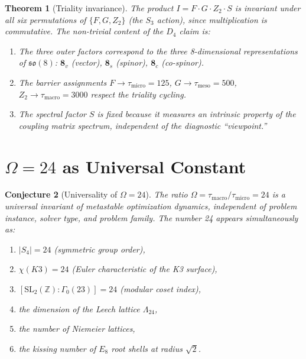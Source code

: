 \documentclass[11pt]{amsart}
\newtheorem{theorem}{Theorem}[section]
\newtheorem{conjecture}[theorem]{Conjecture}
\theoremstyle{definition}
\begin{document}
\begin{theorem}[Triality invariance]\label{thm:triality}
The product $I = F \cdot G \cdot Z_2 \cdot S$ is invariant under all six permutations of $\{F, G, Z_2\}$ (the $S_3$ action), since multiplication is commutative. The non-trivial content of the $D_4$ claim is:
\begin{enumerate}[label=(\roman*)]
\item The three outer factors correspond to the three 8-dimensional representations of $\mathfrak{so}(8)$: $\mathbf{8}_v$ (vector), $\mathbf{8}_s$ (spinor), $\mathbf{8}_c$ (co-spinor).
\item The barrier assignments $F \to \tau_{\mathrm{micro}} = 125$, $G \to \tau_{\mathrm{meso}} = 500$, $Z_2 \to \tau_{\mathrm{macro}} = 3000$ respect the triality cycling.
\item The spectral factor $S$ is fixed because it measures an intrinsic property of the coupling matrix spectrum, independent of the diagnostic ``viewpoint.''
\end{enumerate}
\end{theorem}


\section{$\Omega = 24$ as Universal Constant}
\label{sec:omega}

\begin{conjecture}[Universality of $\Omega = 24$]\label{conj:omega}
The ratio $\Omega = \tau_{\mathrm{macro}} / \tau_{\mathrm{micro}} = 24$ is a universal invariant of metastable optimization dynamics, independent of problem instance, solver type, and problem family. The number 24 appears simultaneously as:
\begin{enumerate}[label=(\arabic*)]
\item $|S_4| = 24$ (symmetric group order),
\item $\chi(K3) = 24$ (Euler characteristic of the K3 surface),
\item $[\mathrm{SL}_2(\mathbb{Z}) : \Gamma_0(23)] = 24$ (modular coset index),
\item the dimension of the Leech lattice $\Lambda_{24}$,
\item the number of Niemeier lattices,
\item the kissing number of $E_8$ root shells at radius $\sqrt{2}$.
\end{enumerate}
\end{conjecture}
\end{document}
